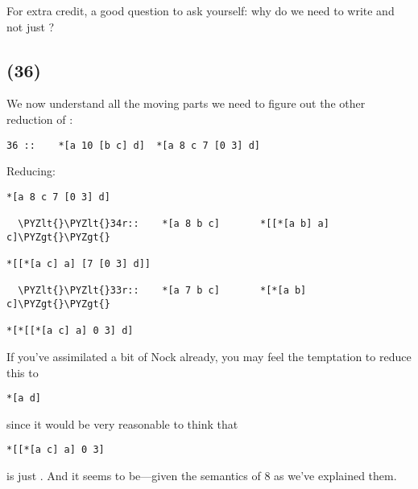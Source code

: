 For extra credit, a good question to ask yourself: why do we
need to write \kode{[7 [0 1] b]} and not just ?

\subsection{ (36)}

We now understand all the moving parts we need to figure out the
other reduction of :

\begin{framed_shaded}
\begin{Verbatim}[fontsize=\relsize{-2.5},fontseries=b,commandchars=\\\{\}]
36 ::    *[a 10 [b c] d]  *[a 8 c 7 [0 3] d]
\end{Verbatim}
\end{framed_shaded}
Reducing:

\begin{framed_shaded}
\begin{Verbatim}[fontsize=\relsize{-2.5},fontseries=b,commandchars=\\\{\}]
*[a 8 c 7 [0 3] d]

  \PYZlt{}\PYZlt{}34r::    *[a 8 b c]       *[[*[a b] a] c]\PYZgt{}\PYZgt{}

*[[*[a c] a] [7 [0 3] d]]

  \PYZlt{}\PYZlt{}33r::    *[a 7 b c]       *[*[a b] c]\PYZgt{}\PYZgt{}

*[*[[*[a c] a] 0 3] d]
\end{Verbatim}
\end{framed_shaded}
If you've assimilated a bit of Nock already, you may feel the
temptation to reduce this to

\begin{framed_shaded}
\begin{Verbatim}[fontsize=\relsize{-2.5},fontseries=b,commandchars=\\\{\}]
*[a d]
\end{Verbatim}
\end{framed_shaded}
since it would be very reasonable to think that

\begin{framed_shaded}
\begin{Verbatim}[fontsize=\relsize{-2.5},fontseries=b,commandchars=\\\{\}]
*[[*[a c] a] 0 3]
\end{Verbatim}
\end{framed_shaded}
is just .  And it seems to be---given the semantics of 8 as
we've explained them.

